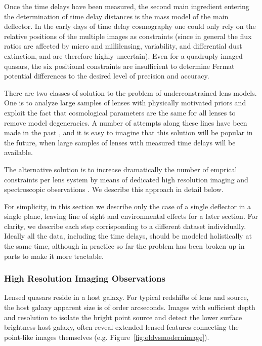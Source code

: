 Once the time delays have been measured, the second main ingredient
entering the determination of time delay distances is the mass model
of the main deflector. In the early days of time delay cosmography one
could only rely on the relative positions of the multiple images as
constraints (since in general the flux ratios are affected by micro
and millilensing, variability, and differential dust extinction, and
are therefore highly uncertain). Even for a quadruply imaged quasars,
the six positional constraints are insufficient to determine Fermat
potential differences to the desired level of precision and accuracy.

There are two classes of solution to the problem of underconstrained
lens models. One is to analyze large samples of lenses with physically
motivated priors and exploit the fact that cosmological parameters are
the same for all lenses to remove model degeneracies. A number of
attempts along these lines have been made in the past \citep{Ogu07},
and it is easy to imagine that this solution will be popular in the
future, when large samples of lenses with measured time delays will be
available.

The alternative solution is to increase dramatically the number of
emprical constraints per lens system by means of dedicated high
resolution imaging and spectroscopic observations
\citep{Suy++10,Suy++13,Suy++14}. We describe this approach in detail
below.

For simplicity, in this section we describe only the case of a single
deflector in a single plane, leaving line of sight and environmental
effects for a later section. For clarity, we describe each step
corrisponding to a different dataset individually. Ideally all the
data, including the time delays, should be modeled holistically at the
same time, although in practice so far the problem has been broken up
in parts to make it more tractable.


\subsubsection{High Resolution Imaging Observations}

Lensed quasars reside in a host galaxy. For typical redshifts of lens
and source, the host galaxy apparent size is of order
arcseconds. Images with sufficient depth and resolution to isolate the
bright point source and detect the lower surface brightness host
galaxy, often reveal extended lensed features connecting the
point-like images themselves (e.g. Figure~\ref{fig:oldvsmodernimage}).

